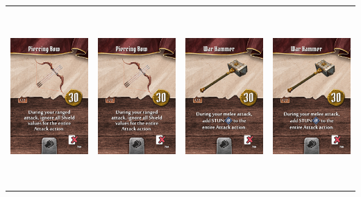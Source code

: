\documentclass{minimal}
\begin{document}
{\begin{longtable}{llll}
\includegraphics[width=44mm,height=68mm]{./1-14/gh-009-piercing-bow.png} &
\includegraphics[width=44mm,height=68mm]{./1-14/gh-009-piercing-bow.png} &
\includegraphics[width=44mm,height=68mm]{./1-14/gh-010-war-hammer.png} &
\includegraphics[width=44mm,height=68mm]{./1-14/gh-010-war-hammer.png}\\ 

\end{longtable}}
\end{document}
